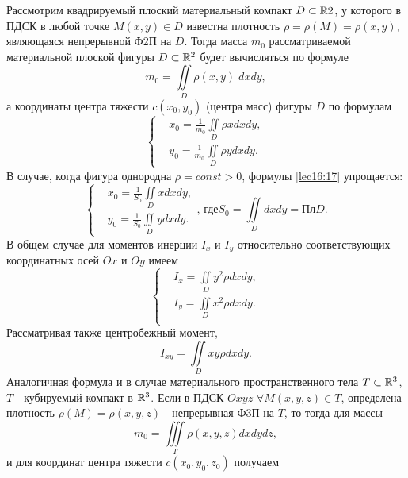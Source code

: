 \documentclass[../../main.tex]{subfiles}
\begin{document}
Рассмотрим квадрируемый плоский материальный компакт
$D \subset \mathbb{R}{2}$, у которого в ПДСК в любой точке $M(x, y) \in D$ известна
плотность $\rho = \rho(M) = \rho(x,y)$, являющаяся непрерывной Ф2П на $D$. 
Тогда
масса $m_0$ рассматриваемой материальной плоской фигуры $D \subset \mathbb{R}^{2}$
будет вычисляться по формуле
\begin{equation}
\label{lec16:15}
m_0 = \iint\limits_D \rho(x, y) \; dxdy,
\end{equation}
а координаты центра тяжести $c(x_0, y_0)$ (центра масс) фигуры $D$ по формулам
\begin{equation}
\label{lec16:16}
\begin{cases}
	&x_0 = \frac{1}{m_0}\iint\limits_D\rho x dx dy,\\
	&y_0 = \frac{1}{m_0}\iint\limits_D\rho y dx dy.
	\end{cases}
\end{equation}
В случае, когда фигура однородна $\rho=const>0$,
 формулы \ref{lec16:17} упрощается:
 \begin{equation*}
 \begin{cases}
 	&x_0 = \frac{1}{S_0}\iint\limits_D x dx dy,\\
 	&y_0 =\frac{1}{S_0}\iint\limits_D y dx dy.
 	\end{cases}
 \text{, где} S_0=\iint\limits_D dxdy=\text{Пл}D.
 \end{equation*}
В общем случае для моментов инерции $I_x$ и $I_y$ относительно соответствующих 
координатных
осей $Ox$ и $Oy$ имеем
\begin{equation}
\label{lec16:17}
\begin{cases}
	&I_x = \iint\limits_Dy^2\rho dx dy,\\
	&I_y = \iint\limits_Dx^2\rho dx dy.\\
	\end{cases}
\end{equation}
Рассматривая также центробежный момент,
\begin{equation}
\label{lec16:18}
I_{xy} = \iint\limits_Dxy\rho dx dy.
\end{equation}
Аналогичная формула и в случае материального пространственного тела
$T \subset \mathbb{R}^{3}$, $T$ - кубируемый компакт в $\mathbb{R}^{3}$.
Если в ПДСК $Oxyz$ $\forall M(x, y, z) \in T$, определена плотность $\rho (M) =
\rho(x, y, z)$ - непрерывная Ф3П на $T$, то тогда для массы
\begin{equation}
\label{lec16:19}
m_0 = \iiint\limits_T \rho(x, y, z) dx dy dz,
\end{equation}
и для координат центра тяжести $c(x_0, y_0, z_0)$ получаем
\end{document}
